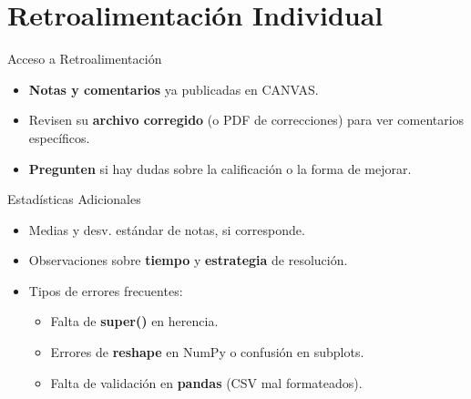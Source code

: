\documentclass[10pt]{beamer}
\begin{document}
\section{Retroalimentación Individual}

\begin{frame}{Acceso a Retroalimentación}
  \begin{itemize}
    \item \textbf{Notas y comentarios} ya publicadas en CANVAS.
    \item Revisen su \textbf{archivo corregido} (o PDF de correcciones) para ver comentarios específicos.
    \item \textbf{Pregunten} si hay dudas sobre la calificación o la forma de mejorar.
  \end{itemize}
\end{frame}

\begin{frame}{Estadísticas Adicionales}
  \begin{itemize}
    \item Medias y desv. estándar de notas, si corresponde.
    \item Observaciones sobre \textbf{tiempo} y \textbf{estrategia} de resolución.
    \item Tipos de errores frecuentes:
      \begin{itemize}
        \item Falta de \textbf{super()} en herencia.
        \item Errores de \textbf{reshape} en NumPy o confusión en subplots.
        \item Falta de validación en \textbf{pandas} (CSV mal formateados).
      \end{itemize}
  \end{itemize}
\end{frame}

\end{document}
